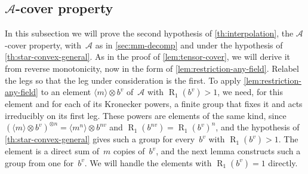 \documentclass[11pt,letterpaper]{article}
\DeclareMathOperator{\tensorrank}{R}
\begin{document}
\subsection{\texorpdfstring{$\mathcal{A}$}{A}-cover property}\label{sec:cover-any-field}

In this subsection we will prove the second hypothesis of \cref{th:interpolation}, the $\mathcal{A}$-cover property, with~$\mathcal{A}$ as in \cref{sec:mm-decomp} and under the hypothesis of \cref{th:star-convex-general}. As in the proof of \cref{lem:tensor-cover}, we will derive it from reverse monotonicity, now in the form of \cref{lem:restriction-any-field}. Relabel the legs so that the leg under consideration is the first. To apply \cref{lem:restriction-any-field} to an element $\langle m \rangle \otimes b^v$ of~$\mathcal{A}$ with $\tensorrank_1(b^v) > 1$, we need, for this element and for each of its Kronecker powers, a finite group that fixes it and acts irreducibly on its first leg. These powers are elements of the same kind, since $(\langle m \rangle \otimes b^v)^{\otimes n} = \langle m^n \rangle \otimes b^{nv}$ and $\tensorrank_1(b^{nv}) = \tensorrank_1(b^v)^n$, and the hypothesis of \cref{th:star-convex-general} gives such a group for every~$b^v$ with $\tensorrank_1(b^v) > 1$. The element is a direct sum of~$m$ copies of~$b^v$, and the next lemma constructs such a group from one for~$b^v$. We will handle the elements with $\tensorrank_1(b^v) = 1$ directly.
\end{document}
